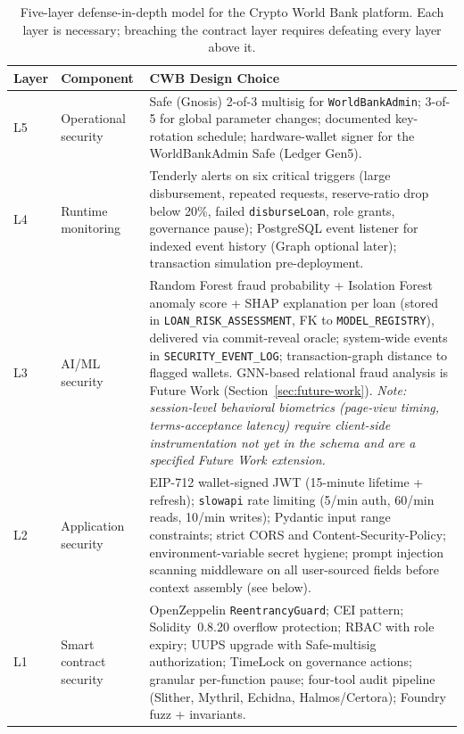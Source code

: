\documentclass[12pt,a4paper]{report}
\newcommand{\tableheadcolor}{\rowcolor{TableHeadBg}}
\begin{document}
\begin{table}[H]
\centering
\caption[Five-layer defense-in-depth model]{Five-layer defense-in-depth model for the Crypto World Bank platform. Each layer is necessary; breaching the contract layer requires defeating every layer above it.}
\label{tab:defense-layers}
\begin{tabular}{p{1.4cm}p{4.0cm}p{8.5cm}}
\toprule
\tableheadcolor
\textbf{Layer} & \textbf{Component} & \textbf{CWB Design Choice} \\
\midrule
L5 & Operational security & Safe (Gnosis) 2-of-3 multisig for \texttt{WorldBankAdmin}; 3-of-5 for global parameter changes; documented key-rotation schedule; hardware-wallet signer for the WorldBankAdmin Safe (Ledger Gen5). \\
L4 & Runtime monitoring & Tenderly alerts on six critical triggers (large disbursement, repeated requests, reserve-ratio drop below 20\%, failed \texttt{disburseLoan}, role grants, governance pause); PostgreSQL event listener for indexed event history (Graph optional later); transaction simulation pre-deployment. \\
L3 & AI/ML security & Random Forest fraud probability + Isolation Forest anomaly score + SHAP explanation per loan (stored in \texttt{LOAN\_RISK\_ASSESSMENT}, FK to \texttt{MODEL\_REGISTRY}), delivered via commit-reveal oracle; system-wide events in \texttt{SECURITY\_EVENT\_LOG}; transaction-graph distance to flagged wallets. GNN-based relational fraud analysis is Future Work (Section~\ref{sec:future-work}). \textit{Note: session-level behavioral biometrics (page-view timing, terms-acceptance latency) require client-side instrumentation not yet in the schema and are a specified Future Work extension.} \\
L2 & Application security & EIP-712 wallet-signed JWT (15-minute lifetime + refresh); \texttt{slowapi} rate limiting (5/min auth, 60/min reads, 10/min writes); Pydantic input range constraints; strict CORS and Content-Security-Policy; environment-variable secret hygiene; prompt injection scanning middleware on all user-sourced fields before context assembly (see below). \\
L1 & Smart contract security & OpenZeppelin \texttt{ReentrancyGuard}; CEI pattern; Solidity~0.8.20 overflow protection; RBAC with role expiry; UUPS upgrade with Safe-multisig authorization; TimeLock on governance actions; granular per-function pause; four-tool audit pipeline (Slither, Mythril, Echidna, Halmos/Certora); Foundry fuzz + invariants. \\
\bottomrule
\end{tabular}
\end{table}
\end{document}
